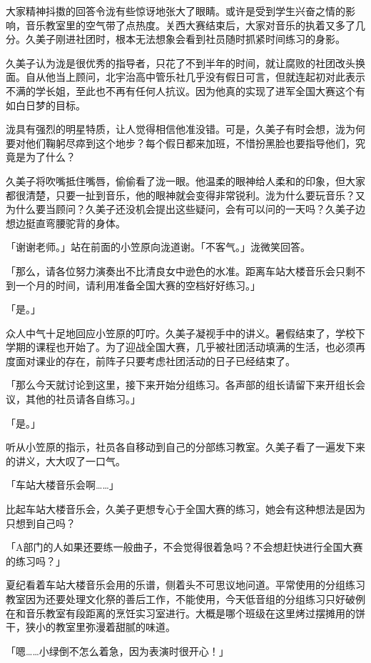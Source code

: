 \documentclass[UTF8]{ctexart}
\begin{document}
    大家精神抖擞的回答令泷有些惊讶地张大了眼睛。或许是受到学生兴奋之情的影响，音乐教室里的空气带了点热度。关西大赛结束后，大家对音乐的执着又多了几分。久美子刚进社团时，根本无法想象会看到社员随时抓紧时间练习的身影。 

    久美子认为泷是很优秀的指导者，只花了不到半年的时间，就让腐败的社团改头换面。自从他当上顾问，北宇治高中管乐社几乎没有假日可言，但就连起初对此表示不满的学长姐，至此也不再有任何人抗议。因为他真的实现了进军全国大赛这个有如白日梦的目标。 

    泷具有强烈的明星特质，让人觉得相信他准没错。可是，久美子有时会想，泷为何要对他们鞠躬尽瘁到这个地步？每个假日都来加班，不惜扮黑脸也要指导他们，究竟是为了什么？ 

    久美子将吹嘴抵住嘴唇，偷偷看了泷一眼。他温柔的眼神给人柔和的印象，但大家都很清楚，只要一扯到音乐，他的眼神就会变得非常锐利。泷为什么要玩音乐？又为什么要当顾问？久美子还没机会提出这些疑问，会有可以问的一天吗？久美子边想边挺直弯腰驼背的身体。 

    「谢谢老师。」站在前面的小笠原向泷道谢。「不客气。」泷微笑回答。 

    「那么，请各位努力演奏出不比清良女中逊色的水准。距离车站大楼音乐会只剩不到一个月的时间，请利用准备全国大赛的空档好好练习。」 

    「是。」 

    众人中气十足地回应小笠原的叮咛。久美子凝视手中的讲义。暑假结束了，学校下学期的课程也开始了。为了迎战全国大赛，几乎被社团活动填满的生活，也必须再度面对课业的存在，前阵子只要考虑社团活动的日子已经结束了。 

    「那么今天就讨论到这里，接下来开始分组练习。各声部的组长请留下来开组长会议，其他的社员请各自练习。」 

    「是。」 

    听从小笠原的指示，社员各自移动到自己的分部练习教室。久美子看了一遍发下来的讲义，大大叹了一口气。 

    「车站大楼音乐会啊……」 

    比起车站大楼音乐会，久美子更想专心于全国大赛的练习，她会有这种想法是因为只想到自己吗？ 

    「A部门的人如果还要练一般曲子，不会觉得很着急吗？不会想赶快进行全国大赛的练习吗？」 

    夏纪看着车站大楼音乐会用的乐谱，侧着头不可思议地问道。平常使用的分组练习教室因为还要处理文化祭的善后工作，不能使用，今天低音组的分组练习只好破例在和音乐教室有段距离的烹饪实习室进行。大概是哪个班级在这里烤过摆摊用的饼干，狭小的教室里弥漫着甜腻的味道。 

    「嗯……小绿倒不怎么着急，因为表演时很开心！」 
\end{document}
